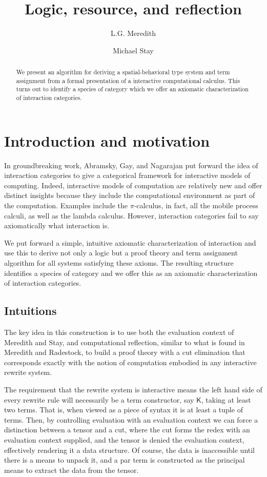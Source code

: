 \documentclass{llncs}
\title{Logic, resource, and reflection}
\author{
L.G. Meredith\inst{2}\\
\and
Michael Stay\inst{1}\\
}
\institute{
  {Pyrofex Corp.}\\
  \email{\fontsize{8}{8}\selectfont stay@pyrofex.net}\\
  \and
  {RChain Cooperative}\\
  \email{\fontsize{8}{8}\selectfont lgreg.meredith@rchain.coop}
}
\renewcommand{\:}{\colon}
\newcommand{\pic}{$\pi$-calculus}
\begin{document}
\maketitle
\begin{abstract}
\noindent
  We present an algorithm for deriving a spatial-behavioral type
  system and term assignment from a formal presentation of a
  interactive computational calculus. This turns out to identify a
  species of category which we offer an axiomatic characterization of
  interaction categories.
\end{abstract}

\section{Introduction and motivation}

In groundbreaking work, Abramsky, Gay, and Nagarajan put forward the
idea of interaction categories to give a categorical framework for
interactive models of computing. Indeed, interactive models of
computation are relatively new and offer distinct insights because
they include the computational environment as part of the
computation. Examples include the {\pic}, in fact, all the mobile
process calculi, as well as the lambda calculus. However, interaction
categories fail to say axiomatically what interaction is.

We put forward a simple, intuitive axiomatic characterization of
interaction and use this to derive not only a logic but a proof theory
and term assignment algorithm for all systems satisfying these
axioms. The resulting structure identifies a species of category and
we offer this as an axiomatic characterization of interaction
categories.

\subsection{Intuitions}

The key idea in this construction is to use both the evaluation
context of Meredith and Stay, and computational reflection, similar to
what is found in Meredith and Radestock, to build a proof theory with
a cut elimination that corresponds exactly with the notion of
computation embodied in any interactive rewrite system.

The requirement that the rewrite system is interactive means the left
hand side of every rewrite rule will necessarily be a term
constructor, say $\mathsf{K}$, taking at least two terms. That is, when
viewed as a piece of syntax it is at least a tuple of terms. Then, by
controlling evaluation with an evaluation context we can force a
distinction between a tensor and a cut, where the cut forms the redex
with an evaluation context supplied, and the tensor is denied the
evaluation context, effectively rendering it a data structure. Of
course, the data is inaccessible until there is a means to unpack it,
and a par term is constructed as the principal means to extract the
data from the tensor.
\end{document}
